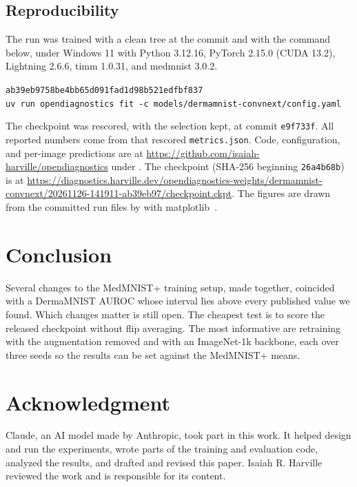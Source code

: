 \documentclass[conference]{IEEEtran}
\begin{document}
\subsection{Reproducibility}

The run was trained with a clean tree at the commit and with the command below, under Windows 11 with Python 3.12.16, PyTorch 2.15.0 (CUDA 13.2), Lightning 2.6.6, timm 1.0.31, and medmnist 3.0.2.
\begin{center}\footnotesize
\texttt{ab39eb9758be4bb65d091fad1d98b521edfbf837}\\[2pt]
\texttt{uv run opendiagnostics fit -c models/dermamnist-convnext/config.yaml}
\end{center}
The checkpoint was rescored, with the selection kept, at commit \texttt{e9f733f}. All reported numbers come from that rescored \texttt{metrics.json}. Code, configuration, and per-image predictions are at \url{https://github.com/isaiah-harville/opendiagnostics} under . The checkpoint (SHA-256 beginning \texttt{26a4b68b}) is at \url{https://diagnostics.harville.dev/opendiagnostics-weights/dermamnist-convnext/20261126-141911-ab39eb97/checkpoint.ckpt}. The figures are drawn from the committed run files by  with matplotlib~\cite{hunter2007matplotlib}.

\section{Conclusion}

Several changes to the MedMNIST+ training setup, made together, coincided with a DermaMNIST AUROC whose interval lies above every published value we found. Which changes matter is still open. The cheapest test is to score the released checkpoint without flip averaging. The most informative are retraining with the augmentation removed and with an ImageNet-1k backbone, each over three seeds so the results can be set against the MedMNIST+ means.

\section*{Acknowledgment}

Claude, an AI model made by Anthropic, took part in this work. It helped design and run the experiments, wrote parts of the training and evaluation code, analyzed the results, and drafted and revised this paper. Isaiah R. Harville reviewed the work and is responsible for its content.



\end{document}
